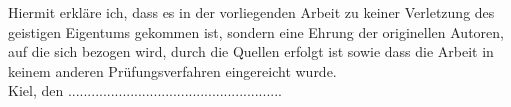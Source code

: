 \null
\vfill
{}
Hiermit erkläre ich, dass es in der vorliegenden Arbeit zu keiner Verletzung des geistigen Eigentums gekommen ist, sondern eine Ehrung der originellen Autoren, auf die sich bezogen wird, durch die Quellen erfolgt ist sowie dass die Arbeit in keinem anderen Prüfungsverfahren eingereicht wurde.\\

Kiel, den ....................\quad\quad\quad...................................